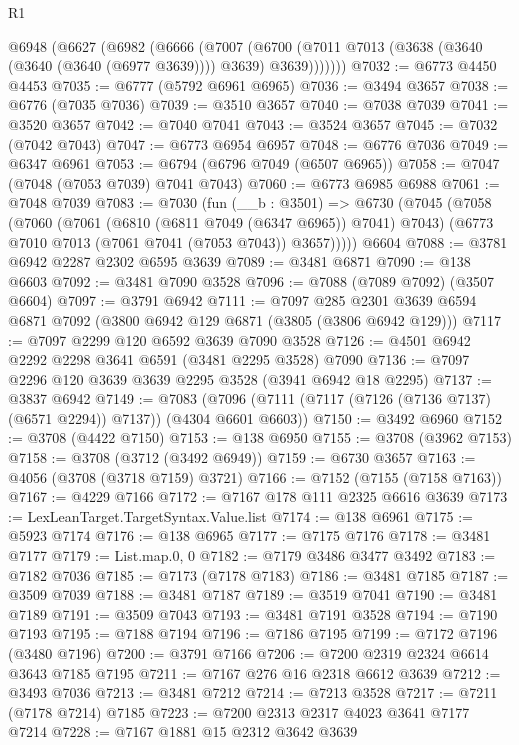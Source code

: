 \begin{lexlean}{R1}
\begin{coremodule}
    @6948
      (@6627
        (@6982
          (@6666
            (@7007
              (@6700 (@7011 @7013 (@3638 (@3640 (@3640 (@3640 (@6977 @3639)))) @3639) @3639)))))))
@7032 := @6773 @4450 @4453
@7035 := @6777 (@5792 @6961 @6965)
@7036 := @3494 @3657
@7038 := @6776 (@7035 @7036)
@7039 := @3510 @3657
@7040 := @7038 @7039
@7041 := @3520 @3657
@7042 := @7040 @7041
@7043 := @3524 @3657
@7045 := @7032 (@7042 @7043)
@7047 := @6773 @6954 @6957
@7048 := @6776 @7036
@7049 := @6347 @6961
@7053 := @6794 (@6796 @7049 (@6507 @6965))
@7058 := @7047 (@7048 (@7053 @7039) @7041 @7043)
@7060 := @6773 @6985 @6988
@7061 := @7048 @7039
@7083 := @7030
    (fun (__b : @3501) =>
    @6730
      (@7045
        (@7058
          (@7060
            (@7061 (@6810 (@6811 @7049 (@6347 @6965)) @7041) @7043)
            (@6773 @7010 @7013 (@7061 @7041 (@7053 @7043)) @3657)))))
    @6604
@7088 := @3781 @6942 @2287 @2302 @6595 @3639
@7089 := @3481 @6871
@7090 := @138 @6603
@7092 := @3481 @7090 @3528
@7096 := @7088 (@7089 @7092) (@3507 @6604)
@7097 := @3791 @6942
@7111 := @7097
    @285
    @2301
    @3639
    @6594
    @6871
    @7092
    (@3800 @6942 @129 @6871 (@3805 (@3806 @6942 @129)))
@7117 := @7097 @2299 @120 @6592 @3639 @7090 @3528
@7126 := @4501 @6942 @2292 @2298 @3641 @6591 (@3481 @2295 @3528) @7090
@7136 := @7097 @2296 @120 @3639 @3639 @2295 @3528 (@3941 @6942 @18 @2295)
@7137 := @3837 @6942
@7149 := @7083 (@7096 (@7111 (@7117 (@7126 (@7136 @7137) (@6571 @2294)) @7137)) (@4304 @6601 @6603))
@7150 := @3492 @6960
@7152 := @3708 (@4422 @7150)
@7153 := @138 @6950
@7155 := @3708 (@3962 @7153)
@7158 := @3708 (@3712 (@3492 @6949))
@7159 := @6730 @3657
@7163 := @4056 (@3708 (@3718 @7159) @3721)
@7166 := @7152 (@7155 (@7158 @7163))
@7167 := @4229 @7166
@7172 := @7167 @178 @111 @2325 @6616 @3639
@7173 := LexLeanTarget.TargetSyntax.Value.list
@7174 := @138 @6961
@7175 := @5923 @7174
@7176 := @138 @6965
@7177 := @7175 @7176
@7178 := @3481 @7177
@7179 := List.map.{0, 0}
@7182 := @7179 @3486 @3477 @3492
@7183 := @7182 @7036
@7185 := @7173 (@7178 @7183)
@7186 := @3481 @7185
@7187 := @3509 @7039
@7188 := @3481 @7187
@7189 := @3519 @7041
@7190 := @3481 @7189
@7191 := @3509 @7043
@7193 := @3481 @7191 @3528
@7194 := @7190 @7193
@7195 := @7188 @7194
@7196 := @7186 @7195
@7199 := @7172 @7196 (@3480 @7196)
@7200 := @3791 @7166
@7206 := @7200 @2319 @2324 @6614 @3643 @7185 @7195
@7211 := @7167 @276 @16 @2318 @6612 @3639
@7212 := @3493 @7036
@7213 := @3481 @7212
@7214 := @7213 @3528
@7217 := @7211 (@7178 @7214) @7185
@7223 := @7200 @2313 @2317 @4023 @3641 @7177 @7214
@7228 := @7167 @1881 @15 @2312 @3642 @3639

\end{coremodule}
\end{lexlean}
